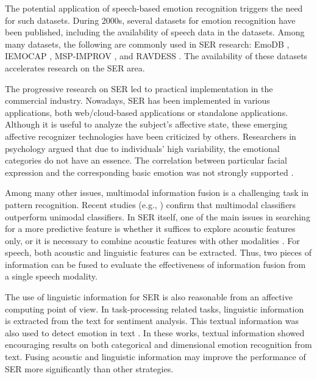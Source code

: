 The potential application of speech-based emotion recognition triggers the need
for such datasets. During 2000s, several datasets for emotion recognition
have been published, including the availability of speech data in the datasets.
Among many datasets, the following are commonly used in SER research: EmoDB
\cite{Burkhardt2005}, IEMOCAP \cite{Busso2008}, MSP-IMPROV \cite{busso2016msp},
and RAVDESS \cite{Livingstone2018}. The availability of these datasets
accelerates research on the SER area.

The progressive research on SER led to practical implementation in the
commercial industry. Nowadays, SER has been implemented in various
applications, both web/cloud-based applications or standalone applications.
Although it is useful to analyze the subject's affective state, these emerging
affective recognizer technologies have been criticized by others. Researchers
in psychology argued that due to individuals' high variability, the emotional
categories do not have an essence. The correlation between
particular facial expression and the corresponding basic emotion was not
strongly supported \cite{Barrett2019}. 

Among many other issues, multimodal information fusion is a challenging task in
pattern recognition. Recent studies (e.g., \cite{Poria2017,Atmaja2020d,
Atmaja2020, Atmaja2019b}) confirm that multimodal classifiers outperform
unimodal classifiers. In SER itself, one of the main issues in searching for a
more predictive feature is whether it suffices to explore acoustic features
only, or it is necessary to combine acoustic features with other modalities
\cite{ElAyadi2011}. For speech, both acoustic and linguistic features can be
extracted. Thus, two pieces of information can be fused to evaluate the
effectiveness of information fusion from a single speech modality.

The use of linguistic information for SER is also reasonable from an affective
computing point of view. In task-processing related tasks, linguistic
information is extracted from the text for sentiment analysis. This textual
information was also used to detect emotion in text
\cite{Alm2005,Mulcrone2012,Calvo2013}. In these works, textual information
showed encouraging results on both categorical and dimensional emotion
recognition from text. Fusing acoustic and linguistic information may improve
the performance of SER more significantly than other strategies.

